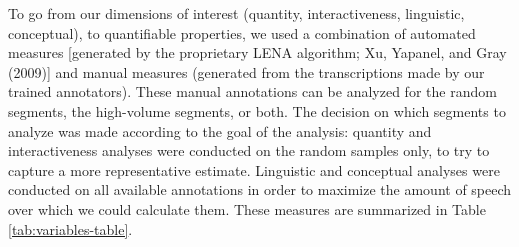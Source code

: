 \documentclass[
  man,floatsintext]{apa6}
\begin{document}
To go from our dimensions of interest (quantity, interactiveness, linguistic, conceptual), to quantifiable properties, we used a combination of automated measures {[}generated by the proprietary LENA algorithm; Xu, Yapanel, and Gray (2009){]} and manual measures (generated from the transcriptions made by our trained annotators). These manual annotations can be analyzed for the random segments, the high-volume segments, or both. The decision on which segments to analyze was made according to the goal of the analysis: quantity and interactiveness analyses were conducted on the random samples only, to try to capture a more representative estimate. Linguistic and conceptual analyses were conducted on all available annotations in order to maximize the amount of speech over which we could calculate them. These measures are summarized in Table \ref{tab:variables-table}.
\end{document}
